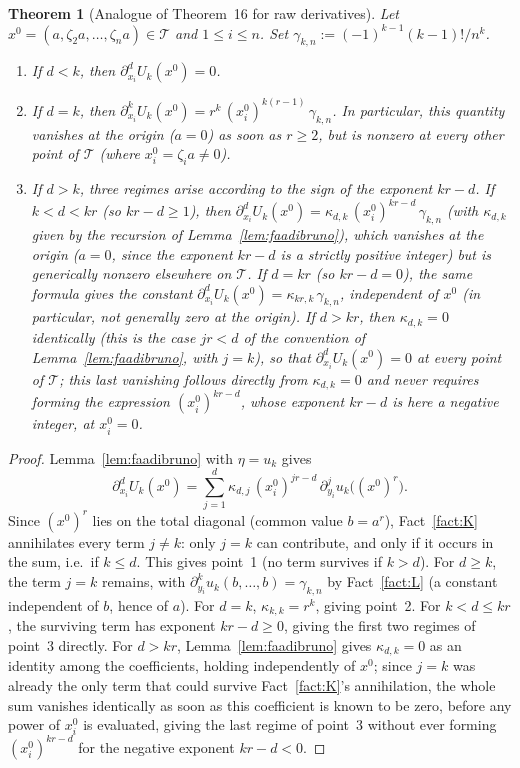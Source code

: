 \documentclass[10pt,a4paper]{amsart}
\newtheorem{theorem}{Theorem}[section]
\begin{document}
\begin{theorem}[Analogue of Theorem~16 for raw derivatives]\label{thm:16brut}
Let $x^0=(a,\zeta_2a,\dots,\zeta_na)\in\mathcal T$ and $1\le i\le n$. Set $\gamma_{k,n}:=(-1)^{k-1}(k-1)!/n^k$.
\begin{enumerate}
\item If $d<k$, then $\partial_{x_i}^d U_k(x^0)=0$.
\item If $d=k$, then $\partial_{x_i}^k U_k(x^0) = r^k\,(x_i^0)^{k(r-1)}\,\gamma_{k,n}$. In particular, this quantity vanishes at the origin ($a=0$) as soon as $r\ge2$, but is nonzero at every other point of $\mathcal T$ (where $x_i^0=\zeta_ia\ne0$).
\item If $d>k$, three regimes arise according to the sign of the exponent $kr-d$. If $k<d<kr$ (so $kr-d\ge1$), then $\partial_{x_i}^dU_k(x^0) = \kappa_{d,k}\,(x_i^0)^{kr-d}\,\gamma_{k,n}$ (with $\kappa_{d,k}$ given by the recursion of Lemma~\ref{lem:faadibruno}), which vanishes at the origin ($a=0$, since the exponent $kr-d$ is a strictly positive integer) but is generically nonzero elsewhere on $\mathcal T$. If $d=kr$ (so $kr-d=0$), the same formula gives the constant $\partial_{x_i}^dU_k(x^0) = \kappa_{kr,k}\,\gamma_{k,n}$, independent of $x^0$ (in particular, not generally zero at the origin). If $d>kr$, then $\kappa_{d,k}=0$ \emph{identically} (this is the case $jr<d$ of the convention of Lemma~\ref{lem:faadibruno}, with $j=k$), so that $\partial_{x_i}^dU_k(x^0)=0$ at \emph{every} point of $\mathcal T$; this last vanishing follows directly from $\kappa_{d,k}=0$ and never requires forming the expression $(x_i^0)^{kr-d}$, whose exponent $kr-d$ is here a negative integer, at $x_i^0=0$.
\end{enumerate}
\end{theorem}

\begin{proof}
Lemma~\ref{lem:faadibruno} with $\eta=u_k$ gives
\[
\partial_{x_i}^dU_k(x^0) = \sum_{j=1}^d \kappa_{d,j}\,(x_i^0)^{jr-d}\,\partial_{y_i}^ju_k\big((x^0)^r\big).
\]
Since $(x^0)^r$ lies on the total diagonal (common value $b=a^r$), Fact~\ref{fact:K} annihilates every term $j\ne k$: only $j=k$ can contribute, and only if it occurs in the sum, i.e.\ if $k\le d$. This gives point~1 (no term survives if $k>d$). For $d\ge k$, the term $j=k$ remains, with $\partial_{y_i}^ku_k(b,\dots,b)=\gamma_{k,n}$ by Fact~\ref{fact:L} (a constant independent of $b$, hence of $a$). For $d=k$, $\kappa_{k,k}=r^k$, giving point~2. For $k<d\le kr$, the surviving term has exponent $kr-d\ge0$, giving the first two regimes of point~3 directly. For $d>kr$, Lemma~\ref{lem:faadibruno} gives $\kappa_{d,k}=0$ as an identity among the coefficients, holding independently of $x^0$; since $j=k$ was already the only term that could survive Fact~\ref{fact:K}'s annihilation, the whole sum vanishes identically as soon as this coefficient is known to be zero, before any power of $x_i^0$ is evaluated, giving the last regime of point~3 without ever forming $(x_i^0)^{kr-d}$ for the negative exponent $kr-d<0$.
\end{proof}
\end{document}
